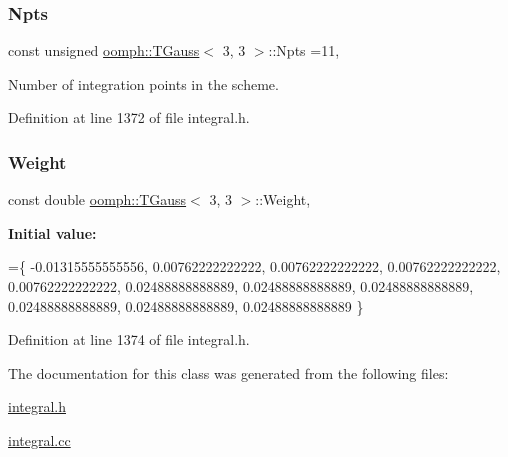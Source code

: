 \subsubsection{\texorpdfstring{Npts}{Npts}}
{\footnotesize\ttfamily const unsigned \hyperlink{classoomph_1_1TGauss}{oomph\+::\+T\+Gauss}$<$ 3, 3 $>$\+::Npts =11\hspace{0.3cm}{\ttfamily [static]}, {\ttfamily [private]}}



Number of integration points in the scheme. 



Definition at line 1372 of file integral.\+h.

\mbox{\label{classoomph_1_1TGauss_3_013_00_013_01_4_ab779b1370485fc9e573fce744abfe9d4}} 
\subsubsection{\texorpdfstring{Weight}{Weight}}
{\footnotesize\ttfamily const double \hyperlink{classoomph_1_1TGauss}{oomph\+::\+T\+Gauss}$<$ 3, 3 $>$\+::Weight\hspace{0.3cm}{\ttfamily [static]}, {\ttfamily [private]}}

{\bfseries Initial value\+:}
\begin{DoxyCode}
=\{
-0.01315555555556,
 0.00762222222222,
 0.00762222222222,
 0.00762222222222,
 0.00762222222222,
 0.02488888888889,
 0.02488888888889,
 0.02488888888889,
 0.02488888888889,
 0.02488888888889,
 0.02488888888889
\}
\end{DoxyCode}


Definition at line 1374 of file integral.\+h.



The documentation for this class was generated from the following files\+:\begin{DoxyCompactItemize}
\item 
\hyperlink{integral_8h}{integral.\+h}\item 
\hyperlink{integral_8cc}{integral.\+cc}\end{DoxyCompactItemize}
